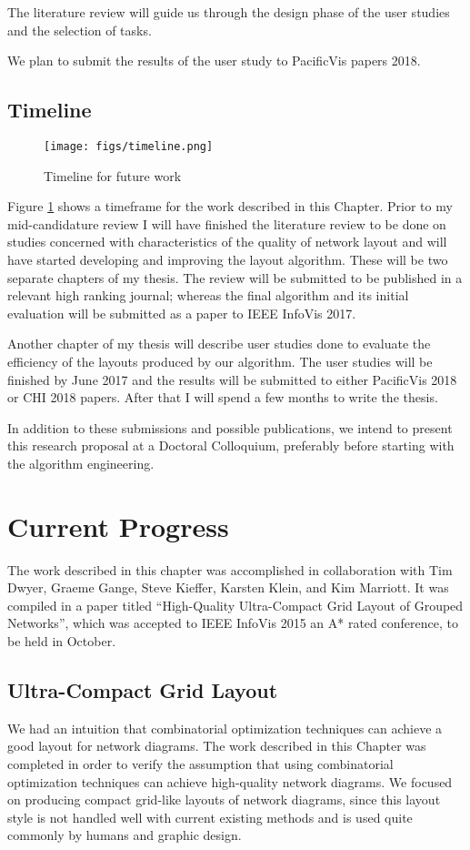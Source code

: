 \documentclass[a4paper,11pt,phdthesis,singlespace,twoside]{cssethesis}
\begin{document}
The literature review will guide us through the design phase of the user studies and the selection of tasks.

We plan to submit the results of the user study to PacificVis papers 2018.

\section{Timeline}

\begin{figure}[ht]
\centering
\texttt{[image: figs/timeline.png]}
\caption{Timeline for future work}
\label{fig:timeline}
\end{figure}

Figure \ref{fig:timeline} shows a timeframe for the work described in this Chapter. Prior to my mid-candidature review I will have finished the literature review to be done on studies concerned with characteristics of the quality of network layout and will have started developing and improving the layout algorithm. These will be two separate chapters of my thesis. The review will be submitted to be published in a relevant high ranking journal; whereas the final algorithm and its initial evaluation will be submitted as a paper to IEEE InfoVis 2017. 

Another chapter of my thesis will describe user studies done to evaluate the efficiency of the layouts produced by our algorithm. The user studies will be finished by June 2017 and the results will be submitted to either PacificVis 2018 or CHI 2018 papers. After that I will spend a few months to write the thesis.

In addition to these submissions and possible publications, we intend to present this research proposal at a Doctoral Colloquium, preferably before starting with the algorithm engineering.

\chapter{Current Progress} \label{progress}

The work described in this chapter was accomplished in collaboration with Tim Dwyer, Graeme Gange, Steve Kieffer, Karsten Klein, and Kim Marriott. It was compiled in a paper titled “High-Quality Ultra-Compact Grid Layout of Grouped Networks”, which was accepted to IEEE InfoVis 2015 an A* rated conference, to be held in October. 
\section{Ultra-Compact Grid Layout}
We had an intuition that combinatorial optimization techniques can achieve a good layout for network diagrams. The work described in this Chapter was completed in order to verify the assumption that using combinatorial optimization techniques can achieve high-quality network diagrams. We focused on producing compact grid-like layouts of network diagrams, since this layout style is not handled well with current existing methods and is used quite commonly by humans and graphic design.
\end{document}
